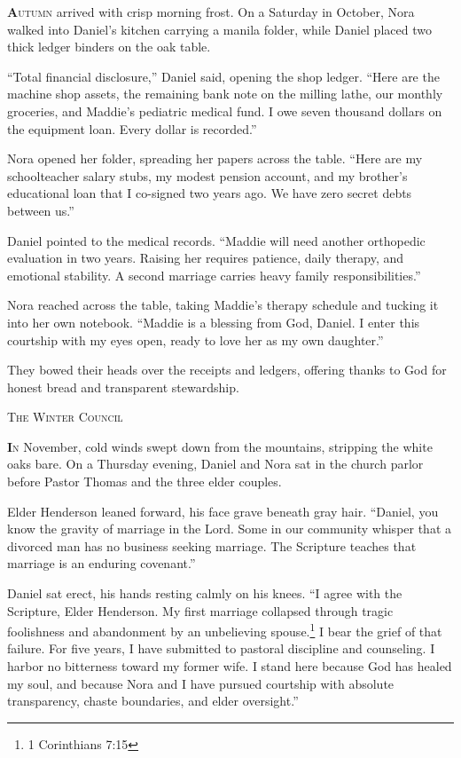 \documentclass[11pt]{article}
\begin{document}
\lettrine[lines=3,findent=3pt,nindent=0pt]{\textbf{A}}{utumn} arrived with crisp morning frost. On a Saturday in October, Nora walked into Daniel's kitchen carrying a manila folder, while Daniel placed two thick ledger binders on the oak table.

``Total financial disclosure,'' Daniel said, opening the shop ledger. ``Here are the machine shop assets, the remaining bank note on the milling lathe, our monthly groceries, and Maddie's pediatric medical fund. I owe seven thousand dollars on the equipment loan. Every dollar is recorded.''

Nora opened her folder, spreading her papers across the table. ``Here are my schoolteacher salary stubs, my modest pension account, and my brother's educational loan that I co-signed two years ago. We have zero secret debts between us.''

Daniel pointed to the medical records. ``Maddie will need another orthopedic evaluation in two years. Raising her requires patience, daily therapy, and emotional stability. A second marriage carries heavy family responsibilities.''

Nora reached across the table, taking Maddie's therapy schedule and tucking it into her own notebook. ``Maddie is a blessing from God, Daniel. I enter this courtship with my eyes open, ready to love her as my own daughter.''

They bowed their heads over the receipts and ledgers, offering thanks to God for honest bread and transparent stewardship.

\newpage

\begin{center}
    {\scshape\large The Winter Council}\par
    \vspace{0.2in}
\end{center}

\lettrine[lines=3,findent=3pt,nindent=0pt]{\textbf{I}}{n} November, cold winds swept down from the mountains, stripping the white oaks bare. On a Thursday evening, Daniel and Nora sat in the church parlor before Pastor Thomas and the three elder couples.

Elder Henderson leaned forward, his face grave beneath gray hair. ``Daniel, you know the gravity of marriage in the Lord. Some in our community whisper that a divorced man has no business seeking marriage. The Scripture teaches that marriage is an enduring covenant.''

Daniel sat erect, his hands resting calmly on his knees. ``I agree with the Scripture, Elder Henderson. My first marriage collapsed through tragic foolishness and abandonment by an unbelieving spouse.\footnote{1 Corinthians 7:15} I bear the grief of that failure. For five years, I have submitted to pastoral discipline and counseling. I harbor no bitterness toward my former wife. I stand here because God has healed my soul, and because Nora and I have pursued courtship with absolute transparency, chaste boundaries, and elder oversight.''
\end{document}
